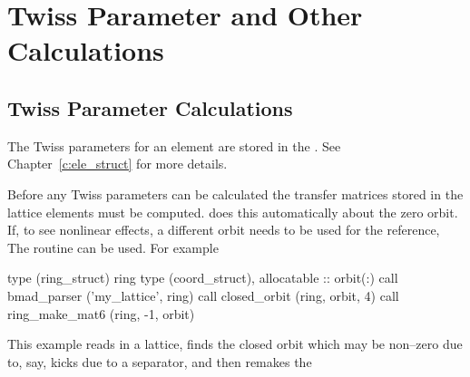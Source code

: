 \chapter{Twiss Parameter and Other Calculations}


\section{Twiss Parameter Calculations}

The Twiss parameters for an element are stored in the
. See Chapter~\ref{c:ele_struct} for more details.

Before any Twiss parameters can be calculated the transfer matrices
stored in the lattice elements must be computed.  does
this automatically about the zero orbit. If, to see nonlinear effects,
a different orbit needs to be used for the reference, The routine
 can be used. For example
\begin{example}
  type (ring_struct) ring
  type (coord_struct), allocatable :: orbit(:)
  call bmad_parser ('my_lattice', ring)
  call closed_orbit (ring, orbit, 4)
  call ring_make_mat6 (ring, -1, orbit)
\end{example}
This example reads in a lattice, finds the closed orbit which may be
non--zero due to, say, kicks due to a separator, and then remakes the
